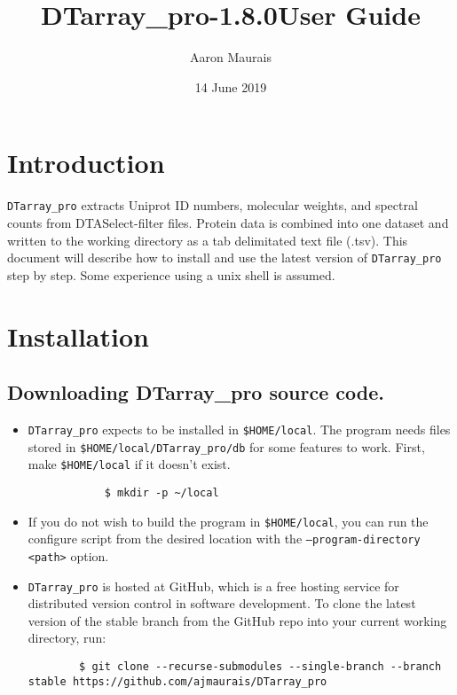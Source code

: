 \documentclass[12pt]{article}
\newcommand{\VERSION}{1.8.0}
\begin{document}
	
	\title{DTarray\_pro-\VERSION \space User Guide}
	\author{Aaron Maurais}
	\date{14 June 2019}
	
	\maketitle
	\tableofcontents
	\newpage
		
	\section{Introduction}
	
	\texttt{DTarray\_pro} extracts Uniprot ID numbers, molecular weights, and spectral counts from DTASelect-filter files. Protein data is combined into one dataset and written to the working directory as a tab delimitated text file (.tsv). This document will describe how to install and use the latest version of \texttt{DTarray\_pro} step by step. Some experience using a unix shell is assumed.  
	
	
	\section{Installation}
	
	\subsection{Downloading DTarray\_pro source code.}

	\begin{itemize}

	\item \texttt{DTarray\_pro} expects to be installed in \texttt{\$HOME/local}. The program needs files stored in \texttt{\$HOME/local/DTarray\_pro/db} for some features to work. First, make \texttt{\$HOME/local} if it doesn't exist.

	\begin{lstlisting}
	 		$ mkdir -p ~/local
	\end{lstlisting}

	\item If you do not wish to build the program in \texttt{\$HOME/local}, you can run the configure script from the desired location with the \texttt{--program-directory <path>} option.

	\item \texttt{DTarray\_pro} is hosted at GitHub, which is a free hosting service for distributed version control in software development. To clone the latest version of the stable branch from the GitHub repo into your current working directory, run:

	\begin{lstlisting}
		$ git clone --recurse-submodules --single-branch --branch stable https://github.com/ajmaurais/DTarray_pro
	\end{lstlisting}

	\end{itemize}
\end{document}
